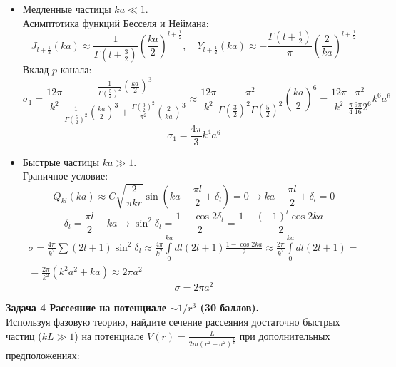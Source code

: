 \documentclass[12pt]{article}
\theoremstyle{definition}
\begin{document}
\begin{itemize}
    \item Медленные частицы $ka\ll1$.\\
    Асимптотика функций Бесселя и Неймана:
    \begin{equation}
        J_{l+\frac{1}{2}}(ka)\approx\frac{1}{\Gamma(l+\frac{3}{2})}\left(\frac{ka}{2}\right)^{l+\frac{1}{2}},\quad Y_{l+\frac{1}{2}}(ka)\approx-\frac{\Gamma(l+\frac{1}{2})}{\pi}\left(\frac{2}{ka}\right)^{l+\frac{1}{2}}
    \end{equation}
    Вклад $p$-канала:
    \begin{equation}
        \sigma_1=\frac{12\pi}{k^2}\frac{\frac{1}{\Gamma(\frac{5}{2})^2}\left(\frac{ka}{2}\right)^3}{\frac{1}{\Gamma(\frac{5}{2})^2}\left(\frac{ka}{2}\right)^3+\frac{\Gamma(\frac{3}{2})^2}{\pi^2}\left(\frac{2}{ka}\right)^3}\approx\frac{12\pi}{k^2}\frac{\pi^2}{\Gamma(\frac{3}{2})^2\Gamma(\frac{5}{2})^2}\left(\frac{ka}{2}\right)^6=\frac{12\pi}{k^2}\frac{\pi^2}{\frac{\pi}{4}\frac{9\pi}{16}2^6}k^6a^6
    \end{equation}
    \begin{equation}
        \boxed{\sigma_1=\frac{4\pi}{3}k^4a^6}
    \end{equation}
    \item Быстрые частицы $ka\gg1$.\\
    Граничное условие:
    \begin{equation}
        Q_{kl}(ka)\approx C\sqrt{\frac{2}{\pi kr}}\sin\left(ka-\frac{\pi l}{2}+\delta_l\right)=0\rightarrow ka-\frac{\pi l}{2}+\delta_l=0
    \end{equation}
    \begin{equation}
        \delta_l=\frac{\pi l}{2}-ka\rightarrow\sin^2\delta_l=\frac{1-\cos2\delta_l}{2}=\frac{1-(-1)^l\cos2ka}{2}
    \end{equation}
    \begin{multline}
        \sigma=\frac{4\pi}{k^2}\sum(2l+1)\sin^2\delta_l\approx\frac{4\pi}{k^2}\int\limits_0^{ka}dl(2l+1)\frac{1-\cos2ka}{2}\approx\frac{2\pi}{k^2}\int\limits_0^{ka}dl(2l+1)=\\=\frac{2\pi}{k^2}(k^2a^2+ka)\approx2\pi a^2
    \end{multline}
    \begin{equation}
        \boxed{\sigma=2\pi a^2}
    \end{equation}
\end{itemize}
\textbf{Задача 4 Рассеяние на потенциале $\sim 1/r^3$ (30 баллов).}\\
Используя фазовую теорию, найдите сечение рассеяния достаточно быстрых частиц ($kL \gg 1$) на потенциале $V(r)=\frac{L}{2m(r^2+a^2)^\frac{3}{2}}$ при дополнительных предположениях:
\end{document}
